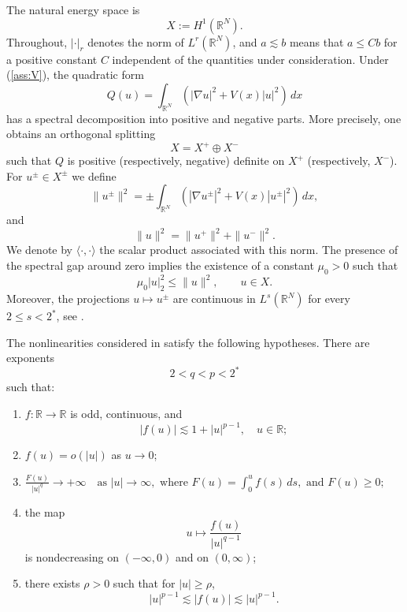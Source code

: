 \documentclass[10pt,a4paper]{amsart}
\numberwithin{equation}{section}
\newcommand{\R}{\mathbb{R}}
\begin{document}
The natural energy space is
\[
X:=H^1(\R^N).
\]
Throughout, $|\cdot|_r$ denotes the norm of $L^r(\R^N)$, and
$a\lesssim b$ means that $a\le Cb$ for a positive constant $C$ independent
of the quantities under consideration. Under (\ref{ass:V}), the quadratic form
\[
Q(u)=\int_{\R^N}\left(|\nabla u|^2+V(x)|u|^2\right)\,dx
\]
has a spectral decomposition into positive and negative parts. More precisely, one
obtains an orthogonal splitting
\[
X=X^+\oplus X^-
\]
such that $Q$ is positive (respectively, negative) definite on $X^+$ (respectively, $X^-$). For $u^\pm\in X^\pm$ we define
\[
\|u^\pm\|^2
=
\pm\int_{\R^N}\left(|\nabla u^\pm|^2
+V(x)|u^\pm|^2\right)\,dx,
\]
and
\[
\|u\|^2=\|u^+\|^2+\|u^-\|^2.
\]
We denote by $\langle\cdot,\cdot\rangle$ the scalar product associated
with this norm. The presence of the spectral gap around zero implies the existence of a constant $\mu_0>0$ such that
\begin{equation}\label{eq:mu0}
\mu_0|u|_2^2\le \|u\|^2,\qquad u\in X.
\end{equation}
Moreover, the projections $u\mapsto u^\pm$ are continuous in
$L^s(\R^N)$ for every $2\le s<2^*$, see \cite[Proposition 7]{Troestler}.

The nonlinearities considered in \cite{BB2022,BBS2025} satisfy the
following hypotheses. There are exponents
\[
2<q<p<2^*
\]
such that:

\begin{enumerate}[label=(F\arabic*)]
\item $f:\R\to\R$ is odd, continuous, and
\[
|f(u)|\lesssim 1+|u|^{p-1}, \quad u \in \R;
\]
\item $f(u)=o(|u|)$ as $u\to0$;
\item
$
\frac{F(u)}{|u|^q}\to+\infty
\quad\text{as } |u|\to\infty, \mbox{ where } F(u)=\int_0^u f(s)\,ds, \mbox{ and } 
F(u)\ge0;
$
\item the map
\[
u\mapsto \frac{f(u)}{|u|^{q-1}}
\]
is nondecreasing on $(-\infty,0)$ and on $(0,\infty)$;
\item there exists $\rho>0$ such that for $|u|\ge\rho$,
\[
|u|^{p-1}\lesssim |f(u)|\lesssim |u|^{p-1}.
\]
\end{enumerate}
\end{document}
